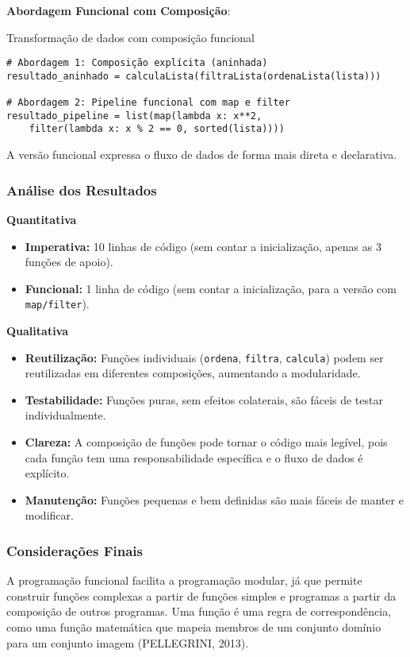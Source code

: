 \textbf{Abordagem Funcional com Composição}:
\begin{codelisting}{Transformação de dados com composição funcional}
    \label{listing:funcional}
    \begin{verbatim}
# Abordagem 1: Composição explícita (aninhada)
resultado_aninhado = calculaLista(filtraLista(ordenaLista(lista)))

# Abordagem 2: Pipeline funcional com map e filter
resultado_pipeline = list(map(lambda x: x**2, 
    filter(lambda x: x % 2 == 0, sorted(lista))))
    \end{verbatim}
\end{codelisting}

A versão funcional expressa o fluxo de dados de forma mais direta e declarativa.

\subsubsection{Análise dos Resultados}
\textbf{Quantitativa}
\begin{itemize}
    \item \textbf{Imperativa:} 10 linhas de código (sem contar a inicialização, apenas as 3 funções de apoio).
    \item \textbf{Funcional:} 1 linha de código (sem contar a inicialização, para a versão com \texttt{map/filter}).
\end{itemize}

\textbf{Qualitativa}
\begin{itemize}
    \item \textbf{Reutilização:} Funções individuais (\texttt{ordena}, \texttt{filtra}, \texttt{calcula}) podem ser reutilizadas em diferentes composições, aumentando a modularidade.
    \item \textbf{Testabilidade:} Funções puras, sem efeitos colaterais, são fáceis de testar individualmente.
    \item \textbf{Clareza:} A composição de funções pode tornar o código mais legível, pois cada função tem uma responsabilidade específica e o fluxo de dados é explícito.
    \item \textbf{Manutenção:} Funções pequenas e bem definidas são mais fáceis de manter e modificar.
\end{itemize}

\subsubsection{Considerações Finais}
A programação funcional facilita a programação modular, já que permite construir funções complexas a partir de funções simples e programas a partir da composição de outros programas. Uma função é uma regra de correspondência, como uma função matemática que mapeia membros de um conjunto domínio para um conjunto imagem (PELLEGRINI, 2013).

